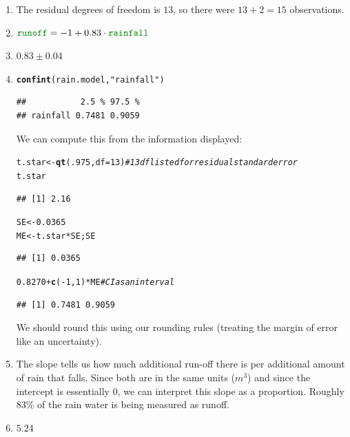 \documentclass[twoside]{book}\usepackage[]{graphicx}\usepackage[]{xcolor}
\makeatletter
\newcommand{\hlnum}[1]{\textcolor[rgb]{0.686,0.059,0.569}{#1}}%
\newcommand{\hlstr}[1]{\textcolor[rgb]{0.192,0.494,0.8}{#1}}%
\newcommand{\hlcom}[1]{\textcolor[rgb]{0.678,0.584,0.686}{\textit{#1}}}%
\newcommand{\hlopt}[1]{\textcolor[rgb]{0,0,0}{#1}}%
\newcommand{\hlstd}[1]{\textcolor[rgb]{0.345,0.345,0.345}{#1}}%
\newcommand{\hlkwb}[1]{\textcolor[rgb]{0.69,0.353,0.396}{#1}}%
\newcommand{\hlkwc}[1]{\textcolor[rgb]{0.333,0.667,0.333}{#1}}%
\newcommand{\hlkwd}[1]{\textcolor[rgb]{0.737,0.353,0.396}{\textbf{#1}}}%
\newenvironment{kframe}{%
 \def\at@end@of@kframe{}%
 \ifinner\ifhmode%
  \def\at@end@of@kframe{\end{minipage}}%
  \begin{minipage}{\columnwidth}%
 \fi\fi%
 \def\FrameCommand##1{\hskip\@totalleftmargin \hskip-\fboxsep
 \colorbox{shadecolor}{##1}\hskip-\fboxsep
     \hskip-\linewidth \hskip-\@totalleftmargin \hskip\columnwidth}%
 \MakeFramed {\advance\hsize-\width
   \@totalleftmargin\z@ \linewidth\hsize
   \@setminipage}}%
 {\par\unskip\endMakeFramed%
 \at@end@of@kframe}
\newenvironment{knitrout}{}{} %
\newcommand{\variable}[1]{{\color{green!50!black}\texttt{#1}}}
\makeatother
\begin{document}
\begin{solution}
	\begin{enumerate}
		\item
			The residual degrees of freedom is $13$, so there were $13 + 2 = 15$
			observations.
\item
	$\variable{runoff} = -1  + 0.83 \cdot \variable{rainfall}$
\item
	$0.83 \pm 0.04$
\item
\begin{knitrout}
\color{fgcolor}\begin{kframe}
\begin{alltt}
\hlkwd{confint}\hlstd{( rain.model,} \hlstr{"rainfall"} \hlstd{)}
\end{alltt}
\begin{verbatim}
##           2.5 % 97.5 %
## rainfall 0.7481 0.9059
\end{verbatim}
\end{kframe}
\end{knitrout}
	We can compute this from the information displayed:
\begin{knitrout}
\color{fgcolor}\begin{kframe}
\begin{alltt}
\hlstd{t.star} \hlkwb{<-} \hlkwd{qt}\hlstd{(} \hlnum{.975}\hlstd{,} \hlkwc{df} \hlstd{=} \hlnum{13} \hlstd{)} \hlcom{# 13 df listed for residual standard error}
\hlstd{t.star}
\end{alltt}
\begin{verbatim}
## [1] 2.16
\end{verbatim}
\begin{alltt}
\hlstd{SE} \hlkwb{<-} \hlnum{0.0365}
\hlstd{ME} \hlkwb{<-} \hlstd{t.star} \hlopt{*} \hlstd{SE; SE}
\end{alltt}
\begin{verbatim}
## [1] 0.0365
\end{verbatim}
\begin{alltt}
\hlnum{0.8270} \hlopt{+} \hlkwd{c}\hlstd{(}\hlopt{-}\hlnum{1}\hlstd{,}\hlnum{1}\hlstd{)} \hlopt{*} \hlstd{ME}  \hlcom{# CI as an interval}
\end{alltt}
\begin{verbatim}
## [1] 0.7481 0.9059
\end{verbatim}
\end{kframe}
\end{knitrout}
We should round this using our rounding rules (treating the margin of error
like an uncertainty).
\item
	The slope tells us how much additional run-off there is per additional
	amount of rain that falls.  Since both are in the same units ($m^3$) and
	since the intercept is essentially 0, we can interpret this slope as a
	proportion.  Roughly 83\% of the rain water is being measured as runoff. 
\item
	$5.24$
	\end{enumerate}
\end{solution}
\end{document}
